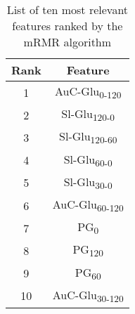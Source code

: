 \documentclass[journal,comsoc]{IEEEtran}
\renewcommand{\^}{\hat}  %
\begin{document}
%
\begin{table}[!h]
  \caption{List of ten most relevant features ranked by the mRMR algorithm}
  \centering
  \begin{tabular}{c c}
    \toprule
    Rank &  Feature\\
    \midrule \midrule
    1 & AuC-Glu\textsubscript{0-120}\\
    2 & Sl-Glu\textsubscript{120-0}\\
    3 & Sl-Glu\textsubscript{120-60}\\
    4 & Sl-Glu\textsubscript{60-0}\\
    5 & Sl-Glu\textsubscript{30-0}\\
    6 & AuC-Glu\textsubscript{60-120}\\
    7 & PG\textsubscript{0}\\
    8 & PG\textsubscript{120}\\
    9 & PG\textsubscript{60} \\
    10 & AuC-Glu\textsubscript{30-120}\\
    \bottomrule
  \end{tabular}
  \label{tab:ranked}
\end{table}
%
\end{document}
